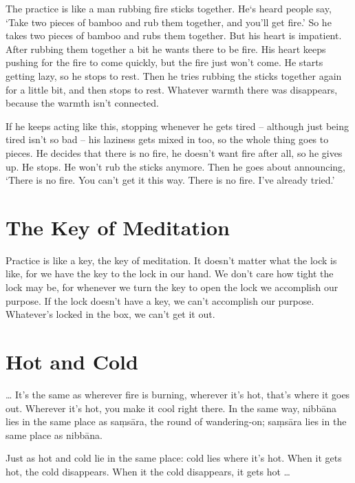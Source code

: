 The practice is like a man rubbing fire sticks together. He`s heard people say, `Take two pieces of bamboo and rub them together, and you'll get fire.' So he takes two pieces of bamboo and rubs them together. But his heart is impatient. After rubbing them together a bit he wants there to be fire. His heart keeps pushing for the fire to come quickly, but the fire just won't come. He starts getting lazy, so he stops to rest. Then he tries rubbing the sticks together again for a little bit, and then stops to rest. Whatever warmth there was disappears, because the warmth isn't connected.

If he keeps acting like this, stopping whenever he gets tired -- although just being tired isn't so bad -- his laziness gets mixed in too, so the whole thing goes to pieces. He decides that there is no fire, he doesn't want fire after all, so he gives up. He stops. He won't rub the sticks anymore. Then he goes about announcing, `There is no fire. You can't get it this way. There is no fire. I've already tried.'

\vspace*{-\baselineskip}
\section{The Key of Meditation}

\enlargethispage{\baselineskip}
Practice is like a key, the key of meditation. It doesn't matter what the lock is like, for we have the key to the lock in our hand. We don't care how tight the lock may be, for whenever we turn the key to open the lock we accomplish our purpose. If the lock doesn't have a key, we can't accomplish our purpose. Whatever's locked in the box, we can't get it out. 

\clearpage

\section{Hot and Cold}

\ldots{}  It's the same as wherever fire is burning, wherever it's hot, that's where it goes out. Wherever it's hot, you make it cool right there. In the same way, nibb\=ana lies in the same place as sa\d{m}s\=ara, the round of wandering-on; sa\d{m}s\=ara lies in the same place as nibb\=ana. 

Just as hot and cold lie in the same place: cold lies where it's hot. When it gets hot, the cold disappears. When it the cold disappears, it gets hot \ldots{}

